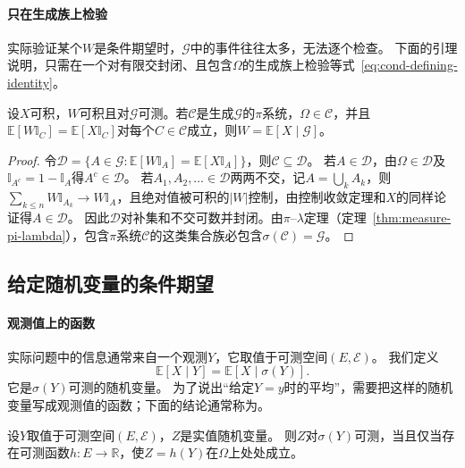 \paragraph{只在生成族上检验}
实际验证某个$W$是条件期望时，$\mathcal G$中的事件往往太多，无法逐个检查。
下面的引理说明，只需在一个对有限交封闭、且包含$\Omega$的生成族上检验等式~\eqref{eq:cond-defining-identity}。

\begin{lemma}[生成族上的检验]
\label{lem:cond-pi-check}
设$X$可积，$W$可积且对$\mathcal G$可测。若$\mathcal C$是生成$\mathcal G$的$\pi$系统，$\Omega\in\mathcal C$，并且$\mathbb E[W\mathbb I_C]=\mathbb E[X\mathbb I_C]$对每个$C\in\mathcal C$成立，则$W=\mathbb E[X\mid\mathcal G]$。
\end{lemma}

\begin{proof}
令$\mathcal D=\{A\in\mathcal G:\mathbb E[W\mathbb I_A]=\mathbb E[X\mathbb I_A]\}$，则$\mathcal C\subseteq\mathcal D$。
若$A\in\mathcal D$，由$\Omega\in\mathcal D$及$\mathbb I_{A^c}=1-\mathbb I_A$得$A^c\in\mathcal D$。
若$A_1,A_2,\ldots\in\mathcal D$两两不交，记$A=\bigcup_kA_k$，则$\sum_{k\leq n}W\mathbb I_{A_k}\to W\mathbb I_A$，且绝对值被可积的$|W|$控制，由控制收敛定理和$X$的同样论证得$A\in\mathcal D$。
因此$\mathcal D$对补集和不交可数并封闭。由$\pi$--$\lambda$定理（定理~\ref{thm:measure-pi-lambda}），包含$\pi$系统$\mathcal C$的这类集合族必包含$\sigma(\mathcal C)=\mathcal G$。
\end{proof}

\subsection{给定随机变量的条件期望}

\paragraph{观测值上的函数}
实际问题中的信息通常来自一个观测$Y$，它取值于可测空间$(E,\mathcal E)$。
我们定义
\[
  \mathbb E[X\mid Y]=\mathbb E[X\mid\sigma(Y)].
\]
它是$\sigma(Y)$可测的随机变量。
为了说出“给定$Y=y$时的平均”，需要把这样的随机变量写成观测值的函数；下面的结论通常称为。

\begin{theorem}
\label{thm:cond-doob-dynkin}
设$Y$取值于可测空间$(E,\mathcal E)$，$Z$是实值随机变量。
则$Z$对$\sigma(Y)$可测，当且仅当存在可测函数$h:E\to\mathbb R$，使$Z=h(Y)$在$\Omega$上处处成立。
\end{theorem}

